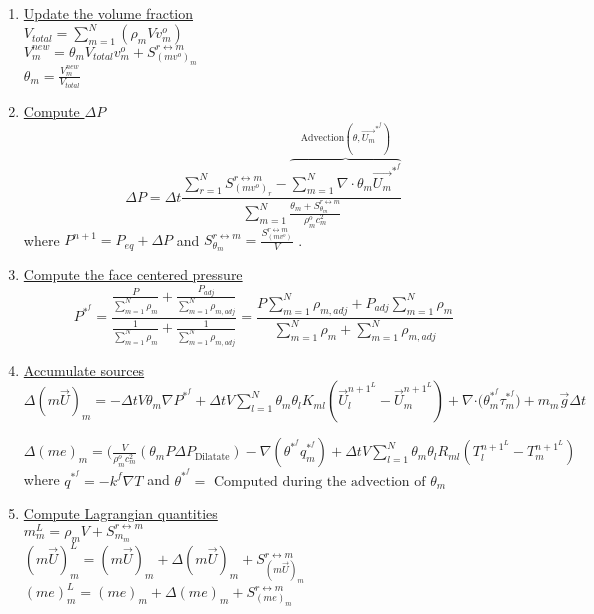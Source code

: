 \documentclass[fleqn]{article}
\newcommand{\SUM}[1]    {\ensuremath{\sum \limits_{{#1}=1}^N }}
\newcommand{\bigS}[1]   {\ensuremath{S^{r \leftrightarrow m}_{#1}}  }
\newcommand{\U}         {{\vec{U}}}
\newcommand{\rhoM}      {\ensuremath{\rho^{o}_m}}
\newcommand{\delt}      {\ensuremath{\Delta{t}} }
\begin{document}
\begin{enumerate}
\item \underline{Update the volume fraction}\\
$V_{total} = \SUM{m}(\rho_m V v^o_m)$\\
$V_m^{new} = \theta_m V_{total}  v^o_m + \bigS{(m v^o)_m}$\\
$\theta_m = \frac{V_m^{new}}{V_{total}} $
\item \underline{Compute $\Delta P$} 
\[
     \Delta P = \Delta t 
                        \frac{   \SUM{r}  \bigS{(m v^o)_r}
                      - \overbrace { \SUM{m} \nabla \cdot \theta_m \vec{U_m}^{*^{f}} } ^{\text{Advection}(\theta, \vec{U_m}^{*^{f}}) } }
                       {\SUM{m}  \frac{\theta_m +\bigS{\theta_m}  } {\rhoM c^2_m}}
\]
where $P^{n+1} = P_{eq} + \Delta{P}$ and $\bigS{\theta_m} = \frac{ \bigS{(m v^o)}}{V}$ .
\item \underline{Compute the face centered pressure}
\[
    P^{*^{f}} = \frac{\frac{P}{\SUM{m} \rho_m} + \frac{P_{adj}}{\SUM{m} \rho_{m, adj}}}
                     {\frac{1}{\SUM{m} \rho_m} + \frac{1}{\SUM{m} \rho_{m, adj}}}
%
              =\frac{ {P \SUM{m} \rho_{m,adj}} + {P_{adj} \SUM{m} \rho_{m} }  }
                 { {\SUM{m} \rho_m} + {\SUM{m} \rho_{m, adj}  }  }
\]
\newpage
\item \underline{Accumulate sources}\\  
 $\Delta(m\vec{U})_m = 
    - \delt V \theta_m \nabla{ P^{*^f}} 
    + \delt V \SUM{l} \theta_m \theta_l K_{ml}(\U_l^{{n+1}^L} - \U_m^{{n+1}^L} )
    + \nabla{ \cdot (\theta^{*^f}_m \tau^{*^f}_m})
    + m_m \vec{g}\delt$
    
 $\Delta(me)_m =  
    (\frac{V} {\rhoM c^2_m}(\theta_m P \Delta P_{\text{Dilatate}})
    - \nabla (\theta^{*^f} q_{m}^{*^f})
    + \delt V \SUM{l}  \theta_m \theta_l R_{ml}(T_l^{{n+1}^L} - T_m^{{n+1}^L} )$ \\
where $q^{*^f} = - k^f \nabla T$ and $\theta^{*^f} = \text{ Computed during the advection of } \theta_m$

\item \underline{Compute Lagrangian quantities}\\
    $m^L_m     = {\rho_m}V + \bigS{m_m} $ \\
    $(m\U)^L_m = (m\U)_m + \Delta(m\U)_m + \bigS{(m\U)_m}$ \\
    $(m e)^L_m = (m e)_m + \Delta(m e)_m + \bigS{(me)_m}$\\


\end{enumerate}
\end{document}

